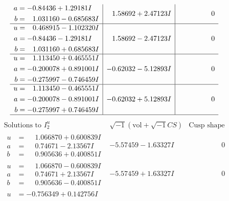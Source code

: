 \documentclass[1p]{elsarticle_modified}
\theoremstyle{definition}
\newcommand{\I}{\sqrt{-1}}
\begin{document}
$$\begin{array}{c|c|c}
\begin{aligned}
a &= -0.84436 + 1.29181 I \\
b &= \phantom{-}1.031160 - 0.685683 I\end{aligned}
 & \phantom{-}1.58692 + 2.47123 I & \phantom{-0.000000 } 0 \\ \hline\begin{aligned}
u &= \phantom{-}0.468915 - 1.102320 I \\
a &= -0.84436 - 1.29181 I \\
b &= \phantom{-}1.031160 + 0.685683 I\end{aligned}
 & \phantom{-}1.58692 - 2.47123 I & \phantom{-0.000000 } 0 \\ \hline\begin{aligned}
u &= \phantom{-}1.113450 + 0.465551 I \\
a &= -0.200078 + 0.891001 I \\
b &= -0.275997 - 0.746459 I\end{aligned}
 & -0.62032 - 5.12893 I & \phantom{-0.000000 } 0 \\ \hline\begin{aligned}
u &= \phantom{-}1.113450 - 0.465551 I \\
a &= -0.200078 - 0.891001 I \\
b &= -0.275997 + 0.746459 I\end{aligned}
 & -0.62032 + 5.12893 I & \phantom{-0.000000 } 0\\
 \hline 
 \end{array}$$\newpage$$\begin{array}{c|c|c}  
\text{Solutions to }I^u_{2}& \I (\text{vol} + \sqrt{-1}CS) & \text{Cusp shape}\\
 \hline 
\begin{aligned}
u &= \phantom{-}1.066870 + 0.600839 I \\
a &= \phantom{-}0.74671 - 2.13567 I \\
b &= \phantom{-}0.905636 + 0.400851 I\end{aligned}
 & -5.57459 - 1.63327 I & \phantom{-0.000000 } 0 \\ \hline\begin{aligned}
u &= \phantom{-}1.066870 - 0.600839 I \\
a &= \phantom{-}0.74671 + 2.13567 I \\
b &= \phantom{-}0.905636 - 0.400851 I\end{aligned}
 & -5.57459 + 1.63327 I & \phantom{-0.000000 } 0 \\ \hline\begin{aligned}
u &= -0.756349 + 0.142756 I \\

\end{aligned}
\end{array}$$
\end{document}
